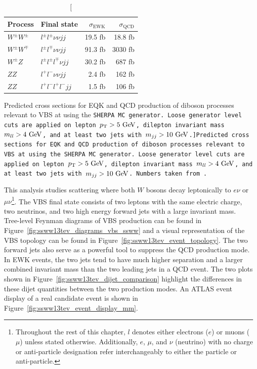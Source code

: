 \begin{table}[htbp]
  \centering
  \begin{tabular}{l l r r}
    Process & Final state & $\sigma_{\textrm{EWK}}$ & $\sigma_{\textrm{QCD}}$ \\
    \hline\hline
    $W^{\pm}W^{\pm}$ & $l^{\pm}l^{\pm}\nu\nu jj$    & 19.5 fb & 18.8 fb \\
    $W^{\pm}W^{\mp}$ & $l^{\pm}l^{\mp}\nu\nu jj$    & 91.3 fb & 3030 fb \\
    $W^{\pm}Z$      & $l^{\pm}l^{\pm}l^{\mp}\nu jj$ & 30.2 fb & 687 fb  \\
    $ZZ$          & $l^{+}l^{-}\nu\nu jj$        & 2.4 fb  & 162 fb  \\
    $ZZ$          & $l^{+}l^{-}l^{+}l^{-} jj$     & 1.5 fb  & 106 fb \\
    \hline
  \end{tabular}
  \caption[Predicted cross sections for EQK and QCD production of diboson processes relevant to VBS at  using the \tt{SHERPA} MC generator.  Loose generator level cuts are applied on lepton $\pt > 5\gev$, dilepton invariant mass $m_{ll} > 4\gev$, and at least two jets with $m_{jj} > 10\gev$.]{Predicted cross sections for EQK and QCD production of diboson processes relevant to VBS at  using the \tt{SHERPA} MC generator.  Loose generator level cuts are applied on lepton $\pt > 5\gev$, dilepton invariant mass $m_{ll} > 4\gev$, and at least two jets with $m_{jj} > 10\gev$.  Numbers taken from~\cite{2013.ssww-8tev-atlas-support}.}
  \label{tab:ssww13tev_qcd_vs_ewk}
\end{table}

This analysis studies \ssww scattering where both $W$ bosons decay leptonically to $e\nu$ or $\mu\nu$\footnote{Throughout the rest of this chapter, $l$ denotes either electrons ($e$) or muons ($\mu$) unless stated otherwise.  Additionally, $e$, $\mu$, and $\nu$ (neutrino) with no charge or anti-particle designation refer interchangeably to either the particle or anti-particle.}.
The \ssww VBS final state consists of two leptons with the same electric charge, two neutrinos, and two high energy forward jets with a large invariant mass.
Tree-level Feynman diagrams of VBS \ssww production can be found in Figure~\ref{fig:ssww13tev_diagrams_vbs_ssww} and a visual representation of the VBS topology can be found in Figure~\ref{fig:ssww13tev_event_topology}.
The two forward jets also serve as a powerful tool to suppress the QCD production mode.
In EWK events, the two jets tend to have much higher separation and a larger combined invariant mass than the two leading jets in a QCD event.
The two plots shown in Figure~\ref{fig:ssww13tev_dijet_comparison} highlight the differences in these dijet quantities between the two production modes.
An ATLAS event display of a real \ssww candidate event is shown in Figure~\ref{fig:ssww13tev_event_display_mm}.

